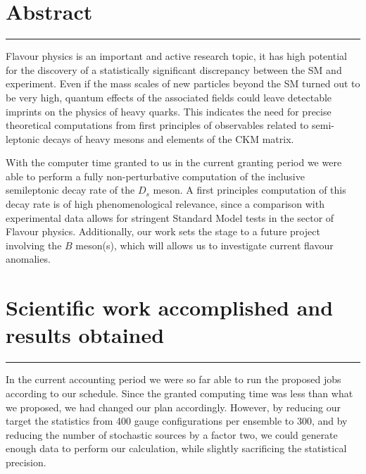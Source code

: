 \documentclass [a4paper, 11pt]{article}
\begin{document}
\newpage

\vfill
\tableofcontents
\vfill

\newpage

\section{Abstract}\label{sec:abstract}
\rule{\textwidth}{0.4pt}


Flavour physics is an important and active research topic, it has high potential
for the discovery of a statistically significant discrepancy between the SM and
experiment.
Even if the mass scales of new
particles beyond the SM turned out to be very high, quantum effects of
the associated fields could leave detectable imprints on the physics
of heavy quarks.
This indicates the need for precise theoretical computations from
first principles of observables related to semi-leptonic decays of
heavy mesons and elements of the CKM matrix. 

With the computer time granted to us in the current granting period we
were able to perform a fully non-perturbative computation of the inclusive semileptonic
decay rate of the $D_s$ meson.
A first principles computation of this decay rate is of high
phenomenological relevance, since a comparison with experimental data
allows for stringent Standard Model tests in the sector of Flavour physics.
Additionally, our work sets the stage to a future
project involving the $B$ meson(s), which will allows us to
investigate current flavour anomalies.



\section{Scientific work accomplished and results obtained}\label{sec:results}
\rule{\textwidth}{0.4pt}

In the current accounting period we were so far able to run the
proposed jobs according to our schedule. Since the granted computing
time was less than what we proposed, we had changed our plan
accordingly.
However, by reducing our target the statistics from 400 gauge
configurations per ensemble to 300, and by reducing the
number of stochastic sources by a factor two,
we could
generate enough data to perform our calculation, while slightly
sacrificing the statistical precision. 
\end{document}
